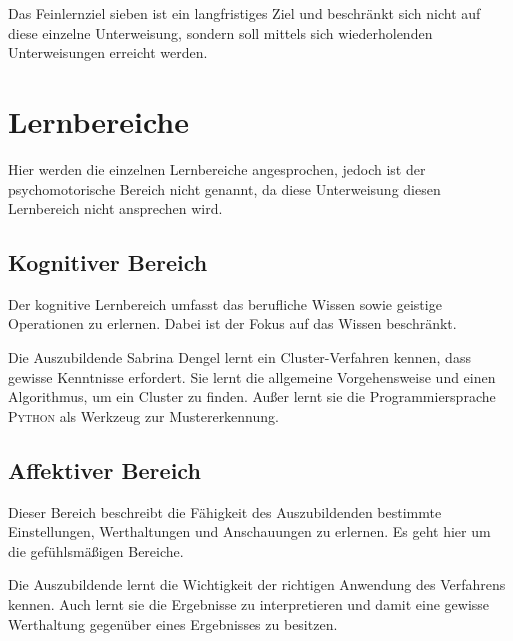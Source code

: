 Das Feinlernziel sieben ist ein langfristiges Ziel und beschränkt sich nicht auf diese einzelne Unterweisung, sondern soll mittels sich wiederholenden Unterweisungen erreicht werden.

\section{Lernbereiche}
Hier werden die einzelnen Lernbereiche angesprochen, jedoch ist der psychomotorische Bereich nicht genannt, da diese Unterweisung diesen Lernbereich nicht ansprechen wird.

\subsection{Kognitiver Bereich}
Der kognitive Lernbereich umfasst das berufliche Wissen sowie geistige Operationen zu erlernen. Dabei ist der Fokus auf das Wissen beschränkt. 
\par
Die Auszubildende Sabrina Dengel lernt ein Cluster-Verfahren kennen, dass gewisse Kenntnisse erfordert. Sie lernt die allgemeine Vorgehensweise und einen Algorithmus, um ein Cluster zu finden. Außer lernt sie die Programmiersprache \textsc{Python} als Werkzeug zur Mustererkennung.

\subsection{Affektiver Bereich}
Dieser Bereich beschreibt die Fähigkeit des Auszubildenden bestimmte Einstellungen, Werthaltungen und Anschauungen zu erlernen. Es geht hier um die gefühlsmäßigen Bereiche.
\par
Die Auszubildende lernt die Wichtigkeit der richtigen Anwendung des Verfahrens kennen. Auch lernt sie die Ergebnisse zu interpretieren und damit eine gewisse Werthaltung gegenüber eines Ergebnisses zu besitzen.


